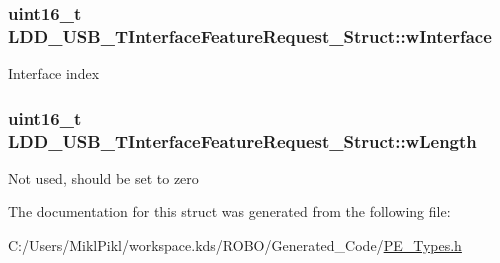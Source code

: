 \subsubsection[{w\+Interface}]{\setlength{\rightskip}{0pt plus 5cm}uint16\+\_\+t L\+D\+D\+\_\+\+U\+S\+B\+\_\+\+T\+Interface\+Feature\+Request\+\_\+\+Struct\+::w\+Interface}\label{struct_l_d_d___u_s_b___t_interface_feature_request___struct_afc1da433b4a02f8c6a6ed6ce8b3065da}
Interface index \hypertarget{struct_l_d_d___u_s_b___t_interface_feature_request___struct_a5f54f1e83024342d9d63aad374a117ba}{}
\subsubsection[{w\+Length}]{\setlength{\rightskip}{0pt plus 5cm}uint16\+\_\+t L\+D\+D\+\_\+\+U\+S\+B\+\_\+\+T\+Interface\+Feature\+Request\+\_\+\+Struct\+::w\+Length}\label{struct_l_d_d___u_s_b___t_interface_feature_request___struct_a5f54f1e83024342d9d63aad374a117ba}
Not used, should be set to zero 

The documentation for this struct was generated from the following file\+:\begin{DoxyCompactItemize}
\item 
C\+:/\+Users/\+Mikl\+Pikl/workspace.\+kds/\+R\+O\+B\+O/\+Generated\+\_\+\+Code/\hyperlink{_p_e___types_8h}{P\+E\+\_\+\+Types.\+h}\end{DoxyCompactItemize}
